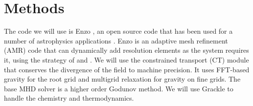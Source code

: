 \section{Methods}
\label{sec.methods}
The code we will use is Enzo \citep{Collins10,Bryan14}, an open source code that
has been used for a number of astrophysics applications
\citep[e.g.][]{Abel02,CorreaMagnus23}.  Enzo is an adaptive mesh refinement (AMR) code
that can dynamically add resolution elements as the system requires it, using the
strategy of \citet{Berger89} and \citet{Balsara01}.  We will
use the constrained transport (CT) module \citep{Gardiner05,Collins10} that conserves the
divergence of the field to machine precision.  It uses FFT-based gravity for the
root grid and multigrid relaxation for gravity on fine grids.  The base MHD
solver is a higher order Godunov method.  We will use Grackle \citep{Smith17} to
handle the chemistry and thermodynamics.

